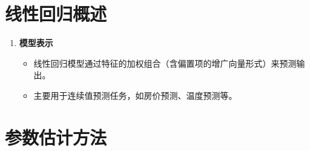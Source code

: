 \documentclass{article}
\theoremstyle{remark}
\theoremstyle{definition}
\theoremstyle{plain}
\numberwithin {equation}{section}
\numberwithin{assumption}{section}
\begin{document}
\section{线性回归概述}
\begin{enumerate}
    \item \textbf{模型表示}
    \begin{itemize}
        \item 线性回归模型通过特征的加权组合（含偏置项的增广向量形式）来预测输出。
        \item 主要用于连续值预测任务，如房价预测、温度预测等。
    \end{itemize}
\end{enumerate}

\section{参数估计方法}
\end{document}

